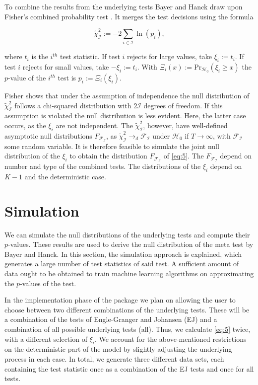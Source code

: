 \documentclass[12pt,a4paper]{article}
\begin{document}
To combine the results from the underlying tests Bayer and Hanck draw
upon Fisher's combined probability test \autocite{Fisher_1932}. It
merges the test decisions using the formula

\begin{equation}
\tilde{\chi}^2_{\mathcal{I}} := -2 \sum_{i \in \mathcal{I}} \ln{(p_i)},
\label{eq:5}
\end{equation}

where \(t_i\) is the \(i^{th}\) test statistic. If test \(i\) rejects
for large values, take \(\xi_i := t_i\). If test \(i\) rejects for small
values, take \(-\xi_i := t_i\). With
\(\Xi_i(x) := \text{Pr}_{\mathcal{H_0}}(\xi_i \geq x)\) the \(p\)-value
of the \(i^{th}\) test is \(p_i := \Xi_i(\xi_i)\).

Fisher shows that under the assumption of independence the null
distribution of \(\tilde{\chi}^2_{\mathcal{I}}\) follows a chi-squared
distribution with \(2\mathcal{I}\) degrees of freedom. If this
assumption is violated the null distribution is less evident. Here, the
latter case occurs, as the \(\xi_i\) are not independent. The
\(\tilde{\chi}^2_{\mathcal{I}}\), however, have well-defined asymptotic
null distributions \(F_{\mathcal{F_I}}\), as
\(\tilde{\chi}^2_{\mathcal{I}} \rightarrow_d \mathcal{F_I}\) under
\(\mathcal{H}_0\) if \(T \rightarrow \infty\), with \(\mathcal{F_I}\)
some random variable. It is therefore feasible to simulate the joint
null distribution of the \(\xi_i\) to obtain the distribution
\(F_{\mathcal{F_I}}\) of \eqref{eq:5}. The \(F_{\mathcal{F_I}}\) depend
on number and type of the combined tests. The distributions of the
\(\xi_i\) depend on \(K-1\) and the deterministic case.

\hypertarget{simulation}{%
\section{Simulation}\label{simulation}}

We can simulate the null distributions of the underlying tests and
compute their \(p\)-values. These results are used to derive the null
distribution of the meta test by Bayer and Hanck. In this section, the
simulation approach is explained, which generates a large number of test
statistics of said test. A sufficient amount of data ought to be
obtained to train machine learning algorithms on approximating the
\(p\)-values of the test.

In the implementation phase of the package we plan on allowing the user
to choose between two different combinations of the underlying tests.
These will be a combination of the tests of Engle-Granger and Johansen
(EJ) and a combination of all possible underlying tests (all). Thus, we
calculate \eqref{eq:5} twice, with a different selection of \(\xi_i\).
We account for the above-mentioned restrictions on the deterministic
part of the model by slightly adjusting the underlying process in each
case. In total, we generate three different data sets, each containing
the test statistic once as a combination of the EJ tests and once for
all tests.
\end{document}
